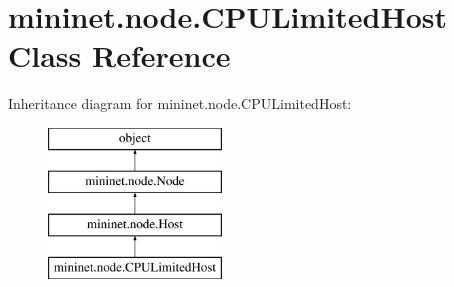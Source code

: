 \hypertarget{classmininet_1_1node_1_1CPULimitedHost}{\section{mininet.\-node.\-C\-P\-U\-Limited\-Host Class Reference}
\label{classmininet_1_1node_1_1CPULimitedHost}
}
Inheritance diagram for mininet.\-node.\-C\-P\-U\-Limited\-Host\-:\begin{figure}[H]
\begin{center}
\leavevmode
\includegraphics[height=4.000000cm]{classmininet_1_1node_1_1CPULimitedHost}
\end{center}
\end{figure}
